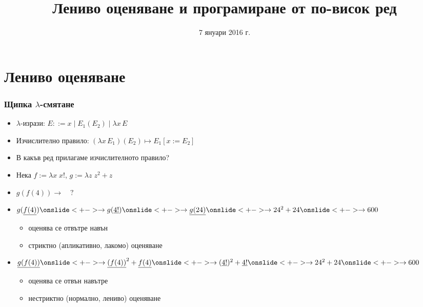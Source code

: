\documentclass{beamer}
\title[Лениво оценяване]{Лениво оценяване и програмиране от по-висок ред}
\date{7 януари 2016 г.}
\begin{document}
\begin{frame}
  \titlepage
\end{frame}


\section{Лениво оценяване}

\begin{frame}
  \frametitle{Щипка $\lambda$-смятане}
  \newcommand{\lra}{\rightarrow}
  \begin{itemize}[<+->]
  \item $\lambda$-изрази: $E ::= x \;|\; E_1(E_2) \;|\; \lambda x\, E$
  \item Изчислително правило: $(\lambda x\,E_1)(E_2) \mapsto E_1[x := E_2]$
  \item В какъв ред прилагаме изчислителното правило?
  \item Нека $f := \lambda x\; x!$, $g := \lambda z\;z^2+z$
  \item $g(f(4)) \lra \quad ?$
  \item $g(\underline{f(4)})
    \onslide<+->
    \lra g(\underline{4!})
    \onslide<+->
    \lra \underline{g(24)}
    \onslide<+->
    \lra 24^2 + 24
    \onslide<+->
    \lra 600$
    \begin{itemize}
    \item<16-> оценява се \alert{отвътре навън}
    \item<17-> \alert{стриктно} (апликативно, лакомо) оценяване
    \end{itemize}
  \item $\underline{g(f(4))}
    \onslide<+->
    \lra \underline{(f(4))}^2 + \underline{f(4)}
    \onslide<+->
    \lra (\underline{4!})^2 + \underline{4!}
    \onslide<+->
    \lra 24^2 + 24
    \onslide<+->
    \lra 600$
    \begin{itemize}
    \item<16-> оценява се \alert{отвън навътре}
    \item<17-> \alert{нестриктно} (нормално, лениво) оценяване
    \end{itemize}
  \end{itemize}
\end{frame}
\end{document}
